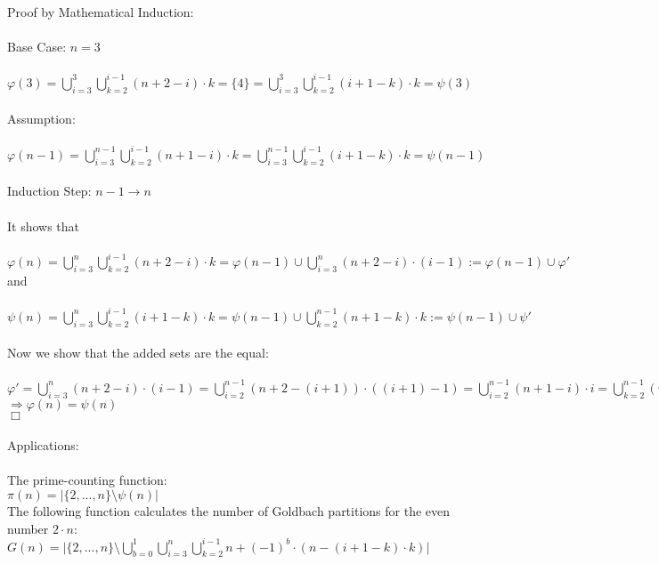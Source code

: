 \documentclass[12pt,ngerman]{article}
\theoremstyle{definition}
\begin{document}
Proof by Mathematical Induction:\\\\
Base Case: $n=3$\\\\
$\varphi(3) = \bigcup\limits_{i = 3}^{3} \bigcup\limits_{k = 2}^{i-1} (n+2-i) \cdot k = \{4\} = \bigcup\limits_{i = 3}^{3} \bigcup\limits_{k = 2}^{i-1} (i+1-k) \cdot k = \psi(3)$\\\\
Assumption:\\\\
$\varphi(n-1) = \bigcup\limits_{i = 3}^{n-1} \bigcup\limits_{k = 2}^{i-1} (n+1-i) \cdot k = \bigcup\limits_{i = 3}^{n-1} \bigcup\limits_{k = 2}^{i-1} (i+1-k) \cdot k = \psi(n-1)$\\\\
Induction Step: $n-1 \rightarrow n$\\\\
It shows that\\\\
$\varphi(n) = \bigcup\limits_{i = 3}^{n} \bigcup\limits_{k = 2}^{i-1} (n+2-i) \cdot k = \varphi(n-1) \cup \bigcup\limits_{i = 3}^{n} (n+2-i) \cdot (i-1) := \varphi(n-1) \cup \varphi'$\\
and\\\\
$\psi(n) = \bigcup\limits_{i = 3}^{n} \bigcup\limits_{k = 2}^{i-1} (i+1-k) \cdot k = \psi(n-1) \cup \bigcup\limits_{k = 2}^{n-1} (n+1-k) \cdot k := \psi(n-1) \cup \psi'$\\\\
Now we show that the added sets are the equal:\\\\
$\varphi' = \bigcup\limits_{i = 3}^{n} (n+2-i) \cdot (i-1) = \bigcup\limits_{i = 2}^{n-1} (n+2-(i+1)) \cdot ((i+1)-1) = \bigcup\limits_{i = 2}^{n-1} (n+1-i) \cdot i = \bigcup\limits_{k = 2}^{n-1} (n+1-k) \cdot k = \psi'$\\
$\Rightarrow \varphi(n) = \psi(n)$\\
$\Box$\\\\
Applications:\\\\
The prime-counting function:\\
$\pi(n) = \vert \{2,...,n\} \setminus \psi(n) \vert$\\
The following function calculates the number of Goldbach partitions for the even number $2 \cdot n$:\\
$G(n) = \vert \{2,...,n\} \setminus \bigcup\limits_{b = 0}^{1} \bigcup\limits_{i = 3}^{n} \bigcup\limits_{k = 2}^{i-1} n + (-1)^b \cdot (n - (i + 1 - k) \cdot k) \vert$\\\\
\end{document}
